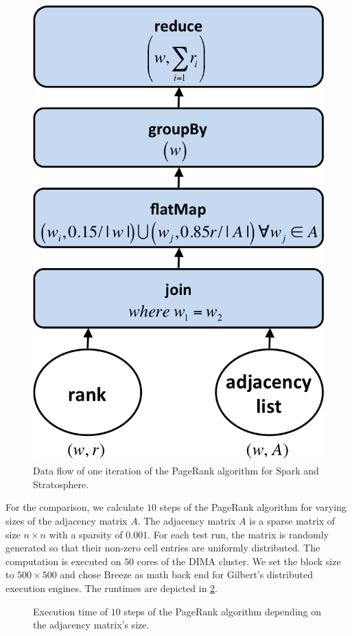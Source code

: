 \begin{figure}[!h]
	\centering
	\includegraphics[width=.3\linewidth]{images/pageRankStep.png}
	\caption{Data flow of one iteration of the PageRank algorithm for Spark and Stratosphere.}
	\label{fig:pageRankDataFlow}
\end{figure}

For the comparison, we calculate $10$ steps of the PageRank algorithm for varying sizes of the adjacency matrix $A$.
The adjacency matrix $A$ is a sparse matrix of size $n \times n$ with a sparsity of $0.001$.
For each test run, the matrix is randomly generated so that their non-zero cell entries are uniformly distributed.
The computation is executed on $50$ cores of the DIMA cluster.
We set the block size to $500 \times 500$ and chose Breeze as math back end for Gilbert's distributed execution engines.
The runtimes are depicted in \cref{fig:pageRankResults}.

\begin{figure}
	\centering
	\caption{Execution time of $10$ steps of the PageRank algorithm depending on the adjacency matrix's size.}
	\label{fig:pageRankResults}
\end{figure}

